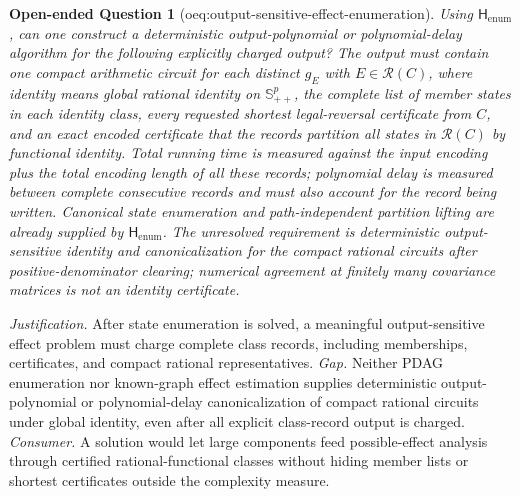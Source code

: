 \documentclass{article}
\newtheorem{openendedquestion}{Open-ended Question}
\begin{document}
\begin{openendedquestion}[oeq:output-sensitive-effect-enumeration]\label{oeq:output-sensitive-effect-enumeration}
Using \(\mathsf H_{\mathrm{enum}}\), can one construct a deterministic output-polynomial or polynomial-delay algorithm for the following explicitly charged output? The output must contain one compact arithmetic circuit for each distinct \(g_E\) with \(E\in\mathcal R(C)\), where identity means global rational identity on \(\mathbb S^p_{++}\), the complete list of member states in each identity class, every requested shortest legal-reversal certificate from \(C\), and an exact encoded certificate that the records partition all states in \(\mathcal R(C)\) by functional identity. Total running time is measured against the input encoding plus the total encoding length of all these records; polynomial delay is measured between complete consecutive records and must also account for the record being written. Canonical state enumeration and path-independent partition lifting are already supplied by \(\mathsf H_{\mathrm{enum}}\). The unresolved requirement is deterministic output-sensitive identity and canonicalization for the compact rational circuits after positive-denominator clearing; numerical agreement at finitely many covariance matrices is not an identity certificate.
\end{openendedquestion}
\par\smallskip\noindent \textit{Justification.} After state enumeration is solved, a meaningful output-sensitive effect problem must charge complete class records, including memberships, certificates, and compact rational representatives. \textit{Gap.} Neither PDAG enumeration nor known-graph effect estimation supplies deterministic output-polynomial or polynomial-delay canonicalization of compact rational circuits under global identity, even after all explicit class-record output is charged. \textit{Consumer.} A solution would let large components feed possible-effect analysis through certified rational-functional classes without hiding member lists or shortest certificates outside the complexity measure.
\end{document}
